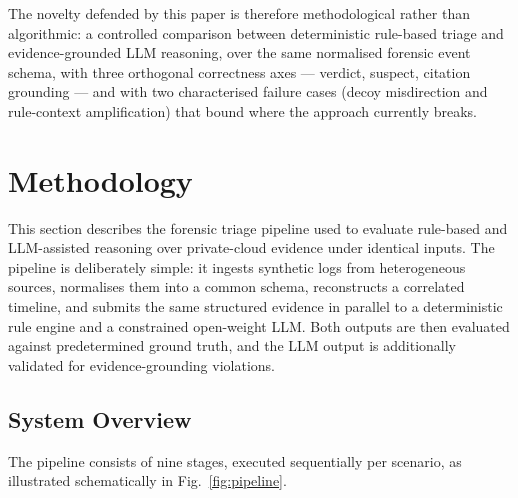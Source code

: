 \documentclass[conference]{IEEEtran}
\begin{document}
The novelty defended by this paper is therefore methodological rather than algorithmic: a controlled comparison between deterministic rule-based triage and evidence-grounded LLM reasoning, over the same normalised forensic event schema, with three orthogonal correctness axes --- verdict, suspect, citation grounding --- and with two characterised failure cases (decoy misdirection and rule-context amplification) that bound where the approach currently breaks.

\section{Methodology}
\label{sec:method}

This section describes the forensic triage pipeline used to evaluate rule-based and LLM-assisted reasoning over private-cloud evidence under identical inputs. The pipeline is deliberately simple: it ingests synthetic logs from heterogeneous sources, normalises them into a common schema, reconstructs a correlated timeline, and submits the same structured evidence in parallel to a deterministic rule engine and a constrained open-weight LLM. Both outputs are then evaluated against predetermined ground truth, and the LLM output is additionally validated for evidence-grounding violations.

\subsection{System Overview}
\label{sec:overview}

The pipeline consists of nine stages, executed sequentially per scenario, as illustrated schematically in Fig.~\ref{fig:pipeline}.
\end{document}
